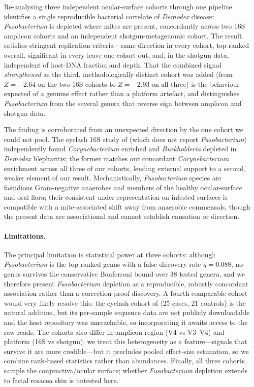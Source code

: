 \documentclass[11pt]{article}
\newcommand{\demodex}{\textit{Demodex}}
\begin{document}
Re-analysing three independent ocular-surface cohorts through one pipeline
identifies a single reproducible bacterial correlate of \demodex{} disease:
\textit{Fusobacterium} is depleted where mites are present, concordantly across
two 16S amplicon cohorts and an independent shotgun-metagenomic cohort. The result
satisfies stringent replication criteria---same direction in every cohort,
top-ranked overall, significant in every leave-one-cohort-out, and, in the shotgun
data, independent of host-DNA fraction and depth. That the combined signal
\emph{strengthened} as the third, methodologically distinct cohort was added
(from $Z=-2.64$ on the two 16S cohorts to $Z=-2.93$ on all three) is the behaviour
expected of a genuine effect rather than a platform artefact, and distinguishes
\textit{Fusobacterium} from the several genera that reverse sign between amplicon
and shotgun data.

The finding is corroborated from an unexpected direction by the one cohort we
could not pool. The eyelash 16S study of \citet{zou2024} (which does not report
\textit{Fusobacterium}) independently found \textit{Corynebacterium} enriched and
\textit{Burkholderia} depleted in \demodex{} blepharitis; the former matches our
concordant \textit{Corynebacterium} enrichment across all three of our cohorts,
lending external support to a second, weaker element of our result.
Mechanistically, \textit{Fusobacterium} species are fastidious Gram-negative
anaerobes and members of the healthy ocular-surface and oral flora; their
consistent under-representation on infested surfaces is compatible with a
mite-associated shift away from anaerobic commensals, though the present data are
associational and cannot establish causation or direction.

\paragraph{Limitations.} The principal limitation is statistical power at three
cohorts: although \textit{Fusobacterium} is the top-ranked genus with a
false-discovery-rate $q=0.088$, no genus survives the conservative Bonferroni
bound over 38 tested genera, and we therefore present \textit{Fusobacterium}
depletion as a reproducible, robustly concordant association rather than a
correction-proof discovery. A fourth comparable cohort would very likely resolve
this: the eyelash cohort of \citet{zou2024} (25 cases, 21 controls) is the natural
addition, but its per-sample sequence data are not publicly downloadable and the
host repository was unreachable, so incorporating it awaits access to the raw
reads. The cohorts also differ in amplicon region (V4 vs V3--V4) and platform (16S
vs shotgun); we treat this heterogeneity as a feature---signals that survive it are
more credible---but it precludes pooled effect-size estimation, so we combine
rank-based statistics rather than abundances. Finally, all three cohorts sample the
conjunctiva/ocular surface; whether \textit{Fusobacterium} depletion extends to
facial rosacea skin is untested here.
\end{document}
